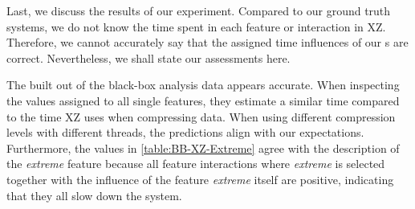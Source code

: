 Last, we discuss the results of our experiment. Compared to our ground truth systems, 
we do not know the time spent in each feature or interaction in \textsc{XZ}. 
Therefore, we cannot accurately say that the assigned time influences of our {\perfInfluenceModel}s are correct. 
Nevertheless, we shall state our assessments here.

The {\perfInfluenceModel} built out of the black-box analysis data appears accurate. 
When inspecting the values assigned to all single features, they estimate a similar time compared to the time \textsc{XZ} uses when compressing data. 
When using different compression levels with different threads, the predictions align with our expectations.
Furthermore, the values in \autoref{table:BB-XZ-Extreme} agree with the description of the \emph{extreme} feature because
all feature interactions where \emph{extreme} is selected together with the influence of the feature \emph{extreme} itself are positive,
indicating that they all slow down the system. 

